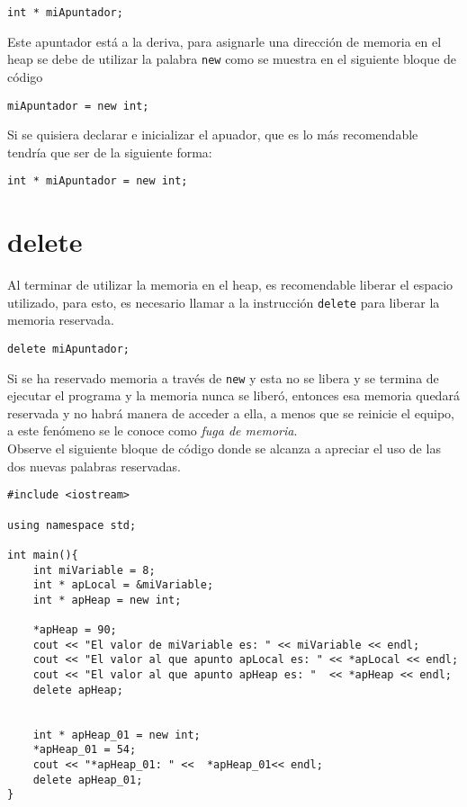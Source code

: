 \documentclass[12pt]{extarticle}
\newcommand{\<}{\langle}
\renewcommand{\>}{\rangle}
\theoremstyle{definition}
\begin{document}
\begin{lstlisting}
int * miApuntador;
\end{lstlisting}

Este apuntador está a la deriva, para asignarle una dirección de memoria en el heap se debe de utilizar la palabra \verb|new| como se muestra en el siguiente bloque de código

\begin{lstlisting}
miApuntador = new int; 
\end{lstlisting}

Si se quisiera declarar e inicializar el apuador, que es lo más recomendable tendría que ser de la siguiente forma: 

\begin{lstlisting}
int * miApuntador = new int; 
\end{lstlisting}


\section{delete}
Al terminar de utilizar la memoria en el heap, es recomendable liberar el espacio utilizado, para esto, es necesario llamar  a la instrucción \verb|delete|  para liberar la memoria reservada.  

\begin{lstlisting}
delete miApuntador;
\end{lstlisting}

Si se ha reservado memoria a través de \verb|new| y esta no se libera y se termina de ejecutar el programa y la memoria nunca se liberó, entonces esa memoria quedará reservada y no habrá manera de acceder a ella, a menos que se reinicie el equipo, a este fenómeno se le conoce como \textit{fuga de memoria}.\\

Observe el siguiente bloque de código donde se alcanza a apreciar el uso de las dos nuevas palabras reservadas. 

\begin{lstlisting}
#include <iostream>

using namespace std; 

int main(){
	int miVariable = 8;
	int * apLocal = &miVariable;
	int * apHeap = new int;
	
	*apHeap = 90;
	cout << "El valor de miVariable es: " << miVariable << endl; 
	cout << "El valor al que apunto apLocal es: " << *apLocal << endl;
	cout << "El valor al que apunto apHeap es: "  << *apHeap << endl; 
	delete apHeap;
	
	
	int * apHeap_01 = new int;
	*apHeap_01 = 54;
	cout << "*apHeap_01: " <<  *apHeap_01<< endl;
	delete apHeap_01;
}
\end{lstlisting}
\end{document}
